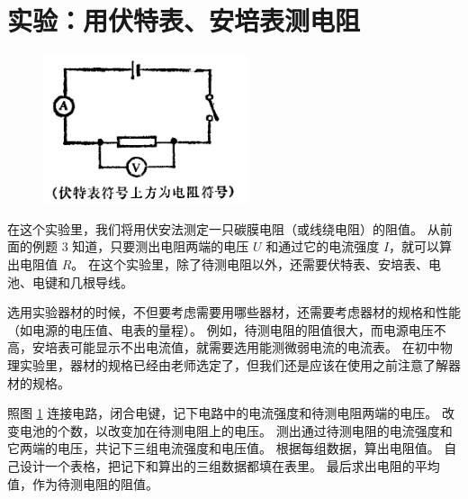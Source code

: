 \section{实验：用伏特表、安培表测电阻}\label{sec:8-8}

\begin{figure}
    \centering
    \includegraphics[width=6cm]{../pic/czwl2-ch8-18}
    \caption{}\label{fig:8-18}
\end{figure}

在这个实验里，我们将用伏安法测定一只碳膜电阻（或线绕电阻）的阻值。
从前面的例题 3 知道，只要测出电阻两端的电压 $U$ 和通过它的电流强度 $I$，就可以算出电阻值 $R$。
在这个实验里，除了待测电阻以外，还需要伏特表、安培表、电池、电键和几根导线。

选用实验器材的时候，不但要考虑需要用哪些器材，还需要考虑器材的规格和性能（如电源的电压值、电表的量程）。
例如，待测电阻的阻值很大，而电源电压不高，安培表可能显示不出电流值，就需要选用能测微弱电流的电流表。
在初中物理实验里，器材的规格已经由老师选定了，但我们还是应该在使用之前注意了解器材的规格。

照图 \ref{fig:8-18} 连接电路，闭合电键，记下电路中的电流强度和待测电阻两端的电压。
改变电池的个数，以改变加在待测电阻上的电压。
测出通过待测电阻的电流强度和它两端的电压，共记下三组电流强度和电压值。
根据每组数据，算出电阻值。
自己设计一个表格，把记下和算出的三组数据都填在表里。
最后求出电阻的平均值，作为待测电阻的阻值。

